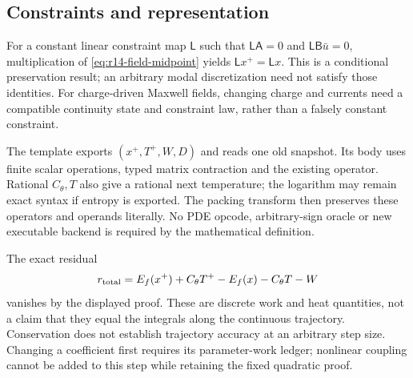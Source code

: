 \subsection{Constraints and representation}
For a constant linear constraint map $\mathsf L$ such that
$\mathsf L\mathsf A=0$ and
$\mathsf L\mathsf B\bar u=0$, multiplication of
\eqref{eq:r14-field-midpoint} yields
$\mathsf Lx^+=\mathsf Lx$. This is a conditional preservation result;
an arbitrary modal discretization need not satisfy those identities. For
charge-driven Maxwell fields, changing charge and currents need a compatible
continuity state and constraint law, rather than a falsely constant constraint.

The template exports $(x^+,T^+,W,D)$ and reads one old snapshot. Its body uses
finite scalar operations, typed matrix contraction and the existing
 operator. Rational $C_\theta,T$ also give a rational
next temperature; the logarithm may remain exact syntax if entropy is exported.
The packing transform then preserves these operators and operands literally.
No PDE opcode, arbitrary-sign oracle or new executable backend is required by
the mathematical definition.

The exact residual
\[
 r_{\rm total}=E_f(x^+)+C_\theta T^+-E_f(x)-C_\theta T-W
\]
vanishes by the displayed proof. These are discrete work and heat quantities,
not a claim that they equal the integrals along the continuous trajectory.
Conservation does not establish trajectory accuracy at an arbitrary step size.
Changing a coefficient first requires its parameter-work ledger; nonlinear
coupling cannot be added to this step while retaining the fixed quadratic proof.
